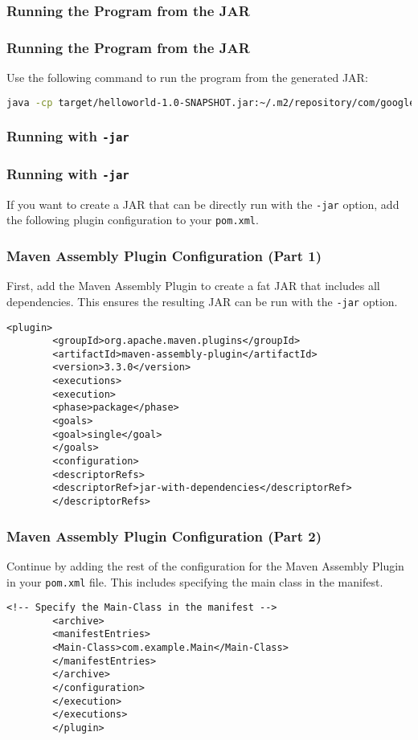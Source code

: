 \documentclass[aspectratio=169, table]{beamer}
\begin{document}
\subsubsection{Running the Program from the JAR}
\begin{frame}[fragile]
	\frametitle{Running the Program from the JAR}
	Use the following command to run the program from the generated JAR:
	\begin{lstlisting}[language=bash]
		java -cp target/helloworld-1.0-SNAPSHOT.jar:~/.m2/repository/com/google/guava/guava/31.1-jre/guava-31.1-jre.jar com.example.Main
	\end{lstlisting}
\end{frame}

\subsubsection{Running with \texttt{-jar}}
\begin{frame}[fragile]
	\vspace{20pt}
	\frametitle{Running with \texttt{-jar}}
	If you want to create a JAR that can be directly run with the \texttt{-jar} option, add the following plugin configuration to your \texttt{pom.xml}.
\end{frame}

\begin{frame}[fragile]
	\vspace{20pt}
	\frametitle{Maven Assembly Plugin Configuration (Part 1)}
	First, add the Maven Assembly Plugin to create a fat JAR that includes all dependencies. This ensures the resulting JAR can be run with the \texttt{-jar} option.
	\begin{lstlisting}[style=XmlStyle]
		<plugin>
		<groupId>org.apache.maven.plugins</groupId>
		<artifactId>maven-assembly-plugin</artifactId>
		<version>3.3.0</version>
		<executions>
		<execution>
		<phase>package</phase>
		<goals>
		<goal>single</goal>
		</goals>
		<configuration>
		<descriptorRefs>
		<descriptorRef>jar-with-dependencies</descriptorRef>
		</descriptorRefs>
	\end{lstlisting}
\end{frame}

\begin{frame}[fragile]
	\frametitle{Maven Assembly Plugin Configuration (Part 2)}
	Continue by adding the rest of the configuration for the Maven Assembly Plugin in your \texttt{pom.xml} file. This includes specifying the main class in the manifest.
	\begin{lstlisting}[style=XmlStyle]
		<!-- Specify the Main-Class in the manifest -->
		<archive>
		<manifestEntries>
		<Main-Class>com.example.Main</Main-Class>
		</manifestEntries>
		</archive>
		</configuration>
		</execution>
		</executions>
		</plugin>
	\end{lstlisting}
\end{frame}
\end{document}
